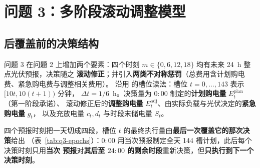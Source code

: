 
\section{问题 3：多阶段滚动调整模型}\label{chap:q3}

\subsection{后覆盖前的决策结构}

问题 3 在问题 2 上增加两个要素：四个时刻 \(m\in\{0,6,12,18\}\) 均有未来 24~h 整点光伏预报，决策随之
\textbf{滚动修正}；并引入\textbf{两类不对称惩罚}（总费用含计划购电费、紧急购电费与调整相关费用）。
沿用  的槽位读法：槽位 \(t=0,\dots,143\) 表示 \([10t,10(t+1))\) 分钟，
\(\Delta t=1/6\)~h。决策量为 \(0{:}00\) 制定的\textbf{计划购电量} \(E^{\text{plan}}_t\)（第一阶段承诺）、
滚动修正后的\textbf{调整购电量} \(E^{\text{adj}}_t\)、由实际负载与光伏决定的\textbf{紧急购电量} \(g_t\)，
以及充放电量 \(c_t,d_t\) 与时段末储电量 \(S_t\)。

四个预报时刻把一天切成四段，槽位 \(t\) 的最终执行量由\textbf{最后一次覆盖它的那次决策}给出
（表~\ref{tab:q3-epochs}）：\(0{:}00\) 用当次预报制定全天 144 槽计划，此后每个决策时刻只用\textbf{当次
预报}对\textbf{其后至 \(24{:}00\) 的剩余时段}重新决策，但\textbf{只执行到下一个决策时刻}。

